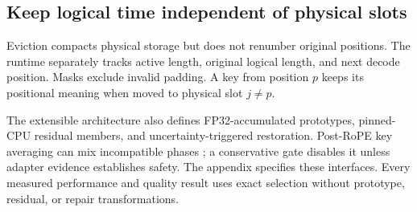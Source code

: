 \subsection{Keep logical time independent of physical slots}
Eviction compacts physical storage but does not renumber original positions.
The runtime separately tracks active length, original logical length, and next
decode position. Masks exclude invalid padding. A key from position $p$ keeps
its positional meaning when moved to physical slot $j\ne p$.

The extensible architecture also defines FP32-accumulated prototypes, pinned-CPU
residual members, and uncertainty-triggered restoration. Post-RoPE key
averaging can mix incompatible phases \citep{su2021rope}; a conservative gate
disables it unless adapter evidence establishes safety. The appendix specifies
these interfaces. Every measured performance and quality result uses exact
selection without prototype, residual, or repair transformations.
